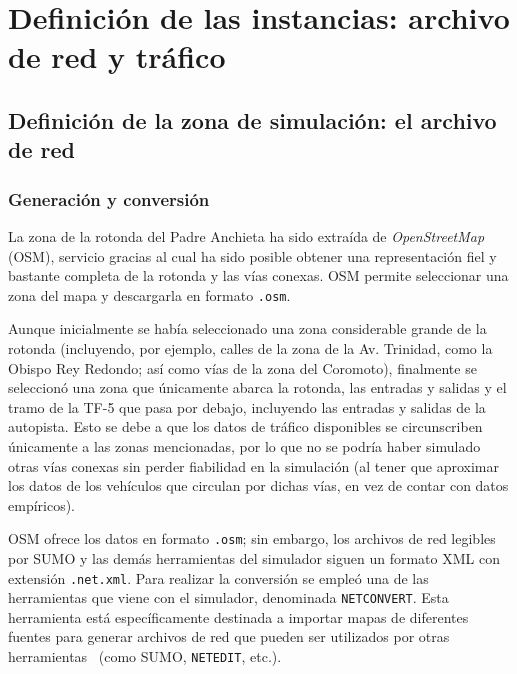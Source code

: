 \chapter{Definición de las instancias: archivo de red y tráfico}
\label{cap:instancias}

\section{Definición de la zona de simulación: el archivo de red}
\label{def_zona_sim_archivo_red}

\subsection{Generación y conversión}
\label{gen_conv}

La zona de la rotonda del Padre Anchieta ha sido extraída de \textit{OpenStreetMap} (OSM), servicio gracias al cual ha sido posible obtener una representación fiel y bastante completa de la rotonda y las vías conexas. OSM permite seleccionar una zona del mapa y descargarla en formato \texttt{.osm}.

Aunque inicialmente se había seleccionado una zona considerable grande de la rotonda (incluyendo, por ejemplo, calles de la zona de la Av. Trinidad, como la Obispo Rey Redondo; así como vías de la zona del Coromoto), finalmente se seleccionó una zona que únicamente abarca la rotonda, las entradas y salidas y el tramo de la TF-5 que pasa por debajo, incluyendo las entradas y salidas de la autopista. Esto se debe a que los datos de tráfico disponibles se circunscriben únicamente a las zonas mencionadas, por lo que no se podría haber simulado otras vías conexas sin perder fiabilidad en la simulación (al tener que aproximar los datos de los vehículos que circulan por dichas vías, en vez de contar con datos empíricos).

OSM ofrece los datos en formato \texttt{.osm}; sin embargo, los archivos de red legibles por SUMO y las demás herramientas del simulador siguen un formato XML con extensión \texttt{.net.xml}. Para realizar la conversión se empleó una de las herramientas que viene con el simulador, denominada \texttt{NETCONVERT}. Esta herramienta está específicamente destinada a importar mapas de diferentes fuentes para generar archivos de red que pueden ser utilizados por otras herramientas~\cite{noauthor_netconvert_nodate} (como SUMO, \texttt{NETEDIT}, etc.).


